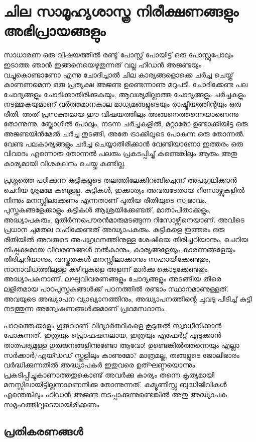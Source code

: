 \section*{ചില സാമൂഹ്യശാസ്ത്ര നിരീക്ഷണങ്ങളും അഭിപ്രായങ്ങളും}
\vskip 2pt

സാധാരണ ഒരു വിഷയത്തില്‍ രണ്ടു് പോസ്റ്റ് പോയിട്ട് ഒരു പോസ്റ്റുപോലും ഇടാത്ത ഞാന്‍ ഇങ്ങനെയെഴുതുന്നത്
വല്ല ഹിഡന്‍ അജണ്ടയും വച്ചുകൊണ്ടാണോ എന്നു ചോദിച്ചാല്‍ ചില കാര്യങ്ങളൊക്കെ ചര്‍ച്ച ചെയ്ത് കാണണമെന്ന 
ഒരു പ്രത്യക്ഷ അജണ്ട ഉണ്ടെന്നാണു മറുപടി. ചോദിക്കേണ്ട പല ചോദ്യങ്ങളും ചോദിക്കാതിരിക്കുകയും, ആവശ്യമില്ലാത്ത 
ചോദ്യങ്ങളും ചര്‍ച്ചകളും നടത്തുകയുമാണ് വര്‍ത്തമാനകാല മാധ്യമങ്ങളുടെയും രാഷ്ട്രീയത്തിന്റയും ഒരു രീതി. അത് 
പ്രസക്തമായ ഈ വിഷയത്തിലും അങ്ങനെത്തന്നെയാണെന്നു തോന്നുന്നു. ബ്ലോഗില്‍ പോലും, നടന്ന ചര്‍ച്ചകളില്‍, 
മറ്റാരോ ഉണ്ടാക്കിയിട്ട ഒരു അജണ്ടയിന്‍മേല്‍ ചര്‍ച്ച തുടങ്ങി, അതേ ട്രാക്കിലൂടെ പോകുന്ന ഒരു തോന്നല്‍. വേണ്ട 
പലകാര്യങ്ങളും ചര്‍ച്ച ചെയ്യാതിരിക്കാന്‍ വേണ്ടിയാണോ ഇത്തരം ഒരു വിവാദം എന്നൊരു തോന്നല്‍ പലരും 
പ്രകടപ്പിച്ചു് കണ്ടെങ്കിലും ആരും അതു കാര്യമായി വിശകലനം ചെയ്തു കണ്ടില്ല.

പ്രശ്നത്തെ പഠിക്കുന്ന കുട്ടികളുടെ തലത്തിലേക്കിറങ്ങിച്ചെന്ന് അപഗ്രഥിക്കാന്‍ ചെറിയ ശ്രമമേ കണ്ടുള്ളൂ. കുട്ടികള്‍, 
ഇക്കാര്യം അവരുടേതായ റിസോഴ്സുകളില്‍ നിന്നും മനസ്സിലാക്കണം എന്നതാണ് പുതിയ രീതിയുടെ സ്വഭാവം. 
പുസ്തകങ്ങളേക്കാളും കുട്ടികള്‍ ആശ്രയിക്കേണ്ടത്, മാതാപിതാക്കളും, അദ്ധ്യാപകരും, മുതിര്‍ന്നപൌരന്‍മാരുമടങ്ങുന്ന 
റിസോഴ്സിനെയാണ്. അവിടെ പ്രധാന ചുമതല വഹിക്കേണ്ടത് അദ്ധ്യാപകരും. കുട്ടികളെ ഇത്തരം ഒരു രീതിയില്‍ 
അവരുടെ അപഗ്രഥനത്തിനുള്ള ശേഷിയെ തിരിച്ചറിയാനും, ചെറിയ നിഷ്പക്ഷമായ വിവരണങ്ങള്‍ നല്‍കാനും, 
കാര്യങ്ങളേയും കാരണങ്ങളേയും തിരിച്ചറിയാനും, വസ്തുതകള്‍ മനസ്സിലാക്കാനും സഹായിക്കേണ്ടതും, നാനാവിധത്തിലുള്ള 
കഴിവുകളെ അളന്ന് മാര്‍ക്കു കൊടുക്കേണ്ടതും അദ്ധ്യാപകനാണ്. ലഘുവിവരണങ്ങളും ചോദ്യങ്ങളും അടങ്ങിയ തീരെ 
ലളിതമായ പാഠപുസ്തകങ്ങള്‍ക്ക് പഠനത്തില്‍ രണ്ടാം സ്ഥാനമാണുള്ളത്. അവയുടെ അദ്ധ്യാപന വ്യാഖ്യാനത്തിനും, 
അദ്ധ്യാപനത്തിന്റെ ചുവടു പിടിച്ച് കുട്ടി നടത്തുന്ന അന്വേഷണങ്ങള്‍ക്കുമാണ് പ്രഥമസ്ഥാനം.

പാഠത്തെക്കാളും ഗുരുവാണ് വിദ്യാര്‍ത്ഥികളെ കൂടുതല്‍ സ്വാധീനിക്കാന്‍ പോകുന്നത്. ഇത്രയും പ്രൊഫഷനലായ, 
ഇത്രയും എഫേര്‍ട്ട് എടുക്കാന്‍ താത്പര്യമുള്ള ഗുരുജനങ്ങളിന്നുണ്ടോ ആവോ! ഉണ്ടെങ്കില്‍ത്തന്നെയും എല്ലാ 
സര്‍ക്കാര്‍/എയ്ഡഡ് സ്കൂളിലും കാണുമോ? മാത്രമല്ല, തങ്ങളുടെ ജോലിഭാരം വര്‍ദ്ധിക്കുന്നതില്‍ അദ്ധ്യാപകര്‍ 
ഇതുവരെ ഉത്ഘണ്ഠയൊന്നും പ്രകടിപ്പിച്ചുകാണാത്തതുകൊണ്ട് അവര്‍ക്കു കാര്യം തന്നെ കൃത്യമായി 
മനസ്സിലായിട്ടില്ലന്നാണെനിക്കു തോന്നുന്നത്. കമ്യൂണിസ്റ്റു ബുദ്ധിജീവികള്‍ എന്തെങ്കിലും ഹിഡന്‍ അജണ്ട 
നടപ്പാക്കുന്നുണ്ടെങ്കില്‍ അതു അദ്ധ്യാപക സമൂഹത്തിലൂടെയായിരിക്കണം

\subsection*{പ്രതികരണങ്ങള്‍}

